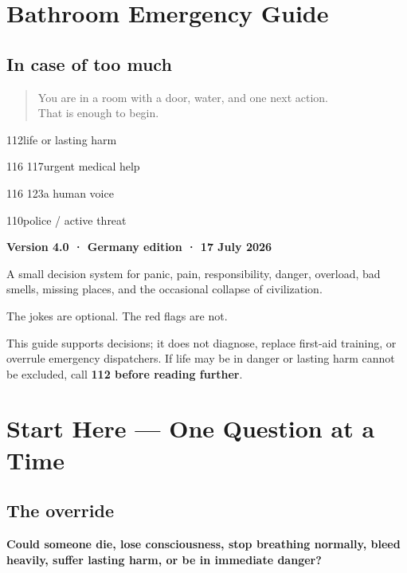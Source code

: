 \hypertarget{00-cover}{}
\hypertarget{bathroom-emergency-guide}{%
\section{Bathroom Emergency Guide}\label{bathroom-emergency-guide}}

\hypertarget{in-case-of-too-much}{%
\subsection{In case of too much}\label{in-case-of-too-much}}

\begin{quote}
You are in a room with a door, water, and one next action.\\
That is enough to begin.
\end{quote}

112life or lasting harm

116 117urgent medical help

116 123a human voice

110police / active threat

\textbf{Version 4.0 · Germany edition · 17 July 2026}

A small decision system for panic, pain, responsibility, danger,
overload, bad smells, missing places, and the occasional collapse of
civilization.

The jokes are optional. The red flags are not.

This guide supports decisions; it does not diagnose, replace first-aid
training, or overrule emergency dispatchers. If life may be in danger or
lasting harm cannot be excluded, call \textbf{112 before reading
further}.

\hypertarget{01-how-to-use}{}
\hypertarget{start-here-one-question-at-a-time}{%
\section{Start Here --- One Question at a
Time}\label{start-here-one-question-at-a-time}}

\hypertarget{the-override}{%
\subsection{The override}\label{the-override}}

\textbf{Could someone die, lose consciousness, stop breathing normally,
bleed heavily, suffer lasting harm, or be in immediate danger?}

